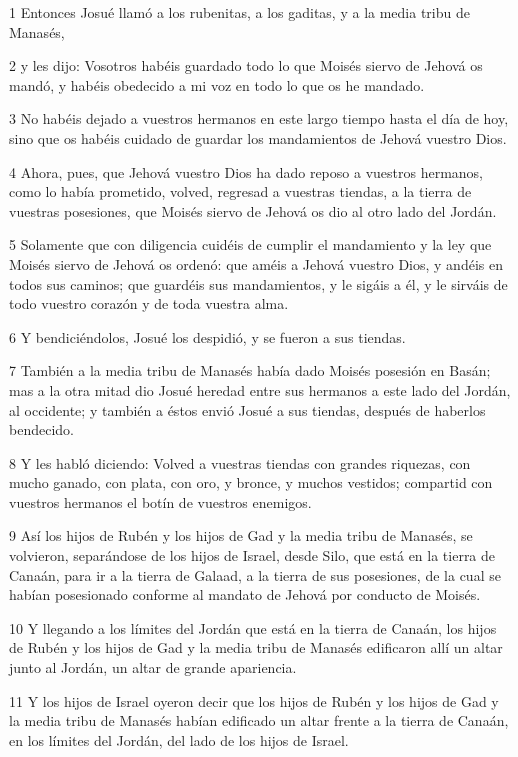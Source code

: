 \par 1 Entonces Josué llamó a los rubenitas, a los gaditas, y a la media tribu de Manasés,
\par 2 y les dijo: Vosotros habéis guardado todo lo que Moisés siervo de Jehová os mandó, y habéis obedecido a mi voz en todo lo que os he mandado. 
\par 3 No habéis dejado a vuestros hermanos en este largo tiempo hasta el día de hoy, sino que os habéis cuidado de guardar los mandamientos de Jehová vuestro Dios.
\par 4 Ahora, pues, que Jehová vuestro Dios ha dado reposo a vuestros hermanos, como lo había prometido, volved, regresad a vuestras tiendas, a la tierra de vuestras posesiones, que Moisés siervo de Jehová os dio al otro lado del Jordán.
\par 5 Solamente que con diligencia cuidéis de cumplir el mandamiento y la ley que Moisés siervo de Jehová os ordenó: que améis a Jehová vuestro Dios, y andéis en todos sus caminos; que guardéis sus mandamientos, y le sigáis a él, y le sirváis de todo vuestro corazón y de toda vuestra alma.
\par 6 Y bendiciéndolos, Josué los despidió, y se fueron a sus tiendas.
\par 7 También a la media tribu de Manasés había dado Moisés posesión en Basán; mas a la otra mitad dio Josué heredad entre sus hermanos a este lado del Jordán, al occidente; y también a éstos envió Josué a sus tiendas, después de haberlos bendecido.
\par 8 Y les habló diciendo: Volved a vuestras tiendas con grandes riquezas, con mucho ganado, con plata, con oro, y bronce, y muchos vestidos; compartid con vuestros hermanos el botín de vuestros enemigos.
\par 9 Así los hijos de Rubén y los hijos de Gad y la media tribu de Manasés, se volvieron, separándose de los hijos de Israel, desde Silo, que está en la tierra de Canaán, para ir a la tierra de Galaad, a la tierra de sus posesiones, de la cual se habían posesionado conforme al mandato de Jehová por conducto de Moisés.
\par 10 Y llegando a los límites del Jordán que está en la tierra de Canaán, los hijos de Rubén y los hijos de Gad y la media tribu de Manasés edificaron allí un altar junto al Jordán, un altar de grande apariencia.
\par 11 Y los hijos de Israel oyeron decir que los hijos de Rubén y los hijos de Gad y la media tribu de Manasés habían edificado un altar frente a la tierra de Canaán, en los límites del Jordán, del lado de los hijos de Israel.
